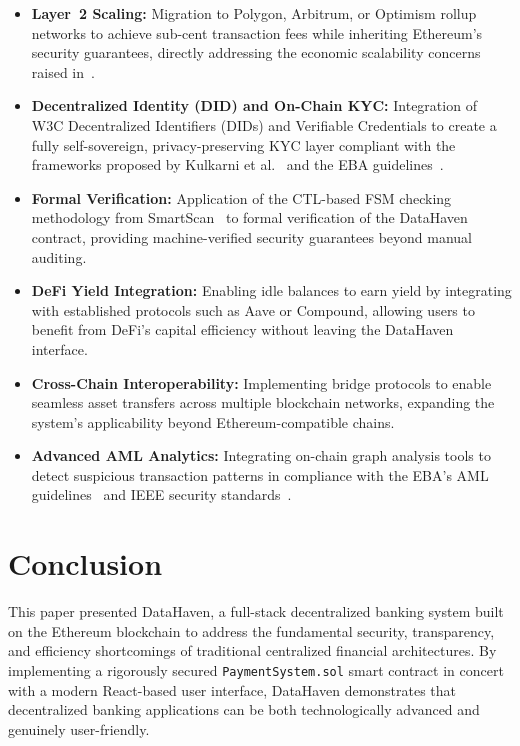 \documentclass[conference]{IEEEtran}
\begin{document}
\begin{itemize}
  \item \textbf{Layer~2 Scaling:} Migration to Polygon, Arbitrum, or Optimism
    rollup networks to achieve sub-cent transaction fees while inheriting
    Ethereum's security guarantees, directly addressing the economic
    scalability concerns raised in~\cite{ref8}.

  \item \textbf{Decentralized Identity (DID) and On-Chain KYC:} Integration of
    W3C Decentralized Identifiers (DIDs) and Verifiable Credentials to create a
    fully self-sovereign, privacy-preserving KYC layer compliant with the
    frameworks proposed by Kulkarni et al.~\cite{ref20} and the EBA
    guidelines~\cite{ref5}.

  \item \textbf{Formal Verification:} Application of the CTL-based FSM checking
    methodology from SmartScan~\cite{ref12} to formal verification of the
    DataHaven contract, providing machine-verified security guarantees beyond
    manual auditing.

  \item \textbf{DeFi Yield Integration:} Enabling idle balances to earn yield
    by integrating with established protocols such as Aave or Compound,
    allowing users to benefit from DeFi's capital efficiency without leaving
    the DataHaven interface.

  \item \textbf{Cross-Chain Interoperability:} Implementing bridge protocols to
    enable seamless asset transfers across multiple blockchain networks,
    expanding the system's applicability beyond Ethereum-compatible chains.

  \item \textbf{Advanced AML Analytics:} Integrating on-chain graph analysis
    tools to detect suspicious transaction patterns in compliance with the EBA's
    AML guidelines~\cite{ref5} and IEEE security standards~\cite{ref16}.
\end{itemize}

\section{Conclusion}
\label{sec:conclusion}

This paper presented DataHaven, a full-stack decentralized banking system built
on the Ethereum blockchain to address the fundamental security, transparency,
and efficiency shortcomings of traditional centralized financial architectures.
By implementing a rigorously secured \texttt{PaymentSystem.sol} smart contract
in concert with a modern React-based user interface, DataHaven demonstrates
that decentralized banking applications can be both technologically advanced
and genuinely user-friendly.
\end{document}
